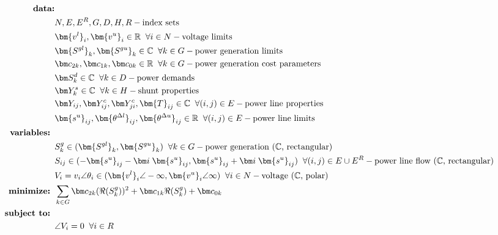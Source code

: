 \begin{align}
%
\mbox{\bf data:} & \nonumber \\ 
& N, E, E^R, G, D, H, R - \mbox{index sets} \nonumber \\ 
& \bm {v^l}_i, \bm {v^u}_i \in \mathbb{R} \;\; \forall i \in N - \mbox{voltage limits} \nonumber \\
& \bm {S^{gl}}_k, \bm {S^{gu}}_k \in \mathbb{C} \;\; \forall k \in G - \mbox{power generation limits} \nonumber \\
& \bm c_{2k}, \bm c_{1k}, \bm c_{0k} \in \mathbb{R} \;\; \forall k \in G - \mbox{power generation cost parameters} \nonumber \\
& \bm S^d_k \in \mathbb{C} \;\; \forall k \in D - \mbox{power demands} \nonumber \\
& \bm Y^s_k \in \mathbb{C} \;\; \forall k \in H - \mbox{shunt properties} \nonumber \\
& \bm Y_{ij}, \bm Y^c_{ij}, \bm Y^c_{ji}, \bm{T}_{ij} \in \mathbb{C} \;\; \forall (i,j) \in E - \mbox{power line properties} \nonumber \\
& \bm {s^u}_{ij}, \bm {\theta^{\Delta l}}_{ij}, \bm {\theta^{\Delta u}}_{ij} \in \mathbb{R} \;\; \forall (i,j) \in E - \mbox{power line limits} \nonumber \\
%
\mbox{\bf variables: } & \nonumber \\
& S^g_k \in (\bm {S^{gl}}_k, \bm {S^{gu}}_k) \;\; \forall k\in G - \mbox{power generation ($\mathbb{C}$, rectangular)} \nonumber \\
& S_{ij} \in (-\bm {s^u}_{ij} - \bm i \;
 \bm {s^u}_{ij}, \bm {s^u}_{ij} + \bm i \;
 \bm {s^u}_{ij}) \;\; \forall (i,j) \in E \cup E^R - \mbox{power line flow ($\mathbb{C}$, rectangular)} \nonumber \\
& V_i = v_i \angle \theta_i \in (\bm {v^l}_i \angle -\infty, \bm {v^u}_i \angle \infty) \;\; \forall i\in N \nonumber - \mbox{voltage ($\mathbb{C}$, polar)} \\
%
\mbox{\bf minimize: } & \sum_{k \in G} \bm c_{2k} (\Re(S^g_k))^2 + \bm c_{1k}\Re(S^g_k) + \bm c_{0k} \\
%
\mbox{\bf subject to: } & \nonumber \\
& \angle V_i = 0 \;\; \forall i \in R \\

\end{align}
